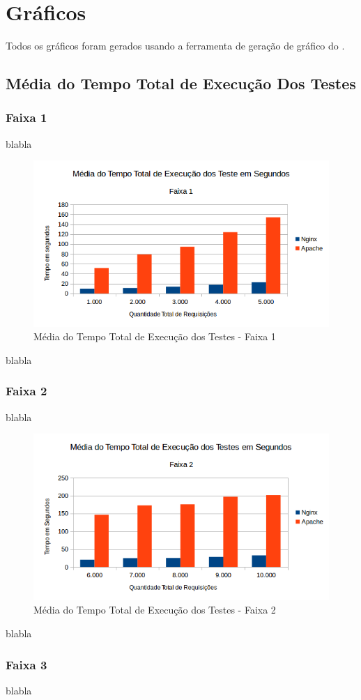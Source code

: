 \section{Gráficos}
Todos os gráficos foram gerados usando a ferramenta de geração de gráfico do 
.
\subsection{Média do Tempo Total de Execução Dos Testes}
\subsubsection{Faixa 1}

blabla
\begin{figure}[htb]
	\centering
	\includegraphics[width=0.6\linewidth]{graficos/grafico1-f1} 
	\caption{Média do Tempo Total de Execução dos Testes - Faixa 1}
	\label{fig:grafico1-f1}
\end{figure}

blabla

\subsubsection{Faixa 2}
blabla

\begin{figure}[htb]
	\centering
	\includegraphics[width=0.6\linewidth]{graficos/grafico1-f2} 
	\caption{Média do Tempo Total de Execução dos Testes - Faixa 2}
	\label{fig:grafico1-f2}
\end{figure}
blabla

\subsubsection{Faixa 3}
blabla

